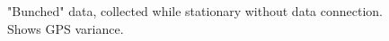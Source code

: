 \documentclass{article}
\begin{document}
\begin{figure}[H]
    \centering
    \begin{center}
    \end{center}
    \caption{"Bunched" data, collected while stationary without data connection. Shows GPS variance.}
    \label{fig:my_label}
\end{figure}
\end{document}
